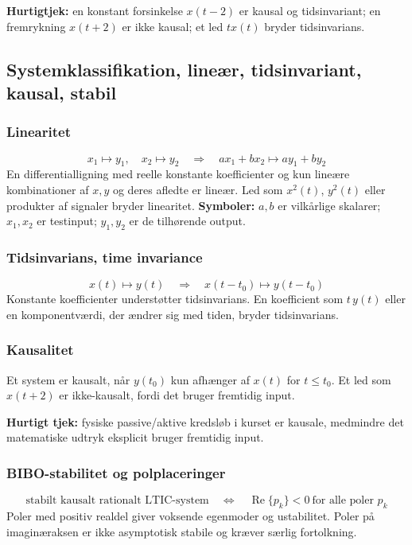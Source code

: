 \textbf{Hurtigtjek:} en konstant forsinkelse \(x(t-2)\) er kausal og tidsinvariant; en fremrykning \(x(t+2)\) er ikke kausal; et led \(t x(t)\) bryder tidsinvarians.

\subsection{Systemklassifikation, lineær, tidsinvariant, kausal, stabil}

\subsubsection{Linearitet}
\[
x_1\mapsto y_1,\quad x_2\mapsto y_2
\quad\Rightarrow\quad
a x_1+b x_2\mapsto a y_1+b y_2
\]
En differentialligning med reelle konstante koefficienter og kun lineære kombinationer af \(x,y\) og deres afledte er lineær. Led som \(x^2(t)\), \(y^2(t)\) eller produkter af signaler bryder linearitet.
\textbf{Symboler:} \(a,b\) er vilkårlige skalarer; \(x_1,x_2\) er testinput; \(y_1,y_2\) er de tilhørende output.

\subsubsection{Tidsinvarians, time invariance}
\[
x(t)\mapsto y(t)\quad\Rightarrow\quad x(t-t_0)\mapsto y(t-t_0)
\]
Konstante koefficienter understøtter tidsinvarians. En koefficient som \(t\,y(t)\) eller en komponentværdi, der ændrer sig med tiden, bryder tidsinvarians.

\subsubsection{Kausalitet}
Et system er kausalt, når \(y(t_0)\) kun afhænger af \(x(t)\) for \(t\leq t_0\). Et led som \(x(t+2)\) er ikke-kausalt, fordi det bruger fremtidig input.

\textbf{Hurtigt tjek:} fysiske passive/aktive kredsløb i kurset er kausale, medmindre det matematiske udtryk eksplicit bruger fremtidig input.

\subsubsection{BIBO-stabilitet og polplaceringer}
\[
\text{stabilt kausalt rationalt LTIC-system}\quad\Longleftrightarrow\quad \operatorname{Re}\{p_k\}<0\ \text{for alle poler }p_k
\]
Poler med positiv realdel giver voksende egenmoder og ustabilitet. Poler på imaginæraksen er ikke asymptotisk stabile og kræver særlig fortolkning.

